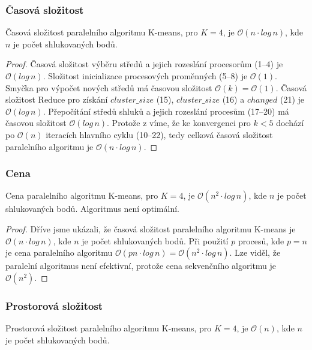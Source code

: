 \documentclass[a4paper, 11pt, fleqn]{scrartcl}
\begin{document}
      \newpage

      \subsubsection{Časová složitost}
        Časová složitost paralelního algoritmu K-means, pro $K = 4$, je $\mathcal{O}(n\cdot log\, n)$, kde $n$ je počet shlukovaných bodů.

        \begin{proof}
          Časová složitost výběru středů a jejich rozeslání procesorům (1--4) je $\mathcal{O}(log\, n)$. Složitost inicializace procesových proměnných (5--8) je $\mathcal{O}(1)$. Smyčka pro výpočet nových středů má časovou složitost $\mathcal{O}(k) = \mathcal{O}(1)$. Časová složitost Reduce pro získání $cluster\_size$ (15), $cluster\_size$ (16) a $changed$ (21) je $\mathcal{O}(log\, n)$. Přepočítání středů shluků a jejich rozeslání procesům (17--20) má časovou složitost $\mathcal{O}(log\, n)$. Protože z \cite{fast} víme, že ke konvergenci pro $k < 5$ dochází po $\mathcal{O}(n)$ iteracích hlavního cyklu (10--22), tedy celková časová složitost paralelního algoritmu je $\mathcal{O}(n\cdot log\, n)$.
        \end{proof}


      \subsubsection{Cena}
        Cena paralelního algoritmu K-means, pro $K = 4$, je $\mathcal{O}(n^2\cdot log\, n)$, kde $n$ je počet shlukovaných bodů. Algoritmus není optimální.

        \begin{proof}
          Dříve jsme ukázali, že časová složitost paralelního algoritmu K-means je $\mathcal{O}(n\cdot log\, n)$, kde $n$ je počet shlukovaných bodů. Při použití $p$ procesů, kde $p = n$ je cena paralelního algoritmu $\mathcal{O}(pn\cdot log\, n) = \mathcal{O}(n^2\cdot log\, n)$. Lze viděl, že paralelní algoritmus není efektivní, protože cena sekvenčního algoritmu je $\mathcal{O}(n^2)$.
        \end{proof}

      \subsubsection{Prostorová složitost}
        Prostorová složitost paralelního algoritmu K-means, pro $K = 4$, je $\mathcal{O}(n)$, kde $n$ je počet shlukovaných bodů.
\end{document}
